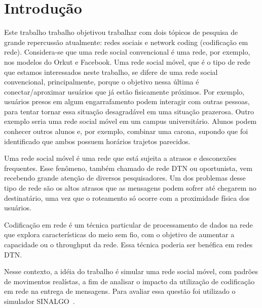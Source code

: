 \section{Introdução}

Este trabalho trabalho objetivou trabalhar com dois tópicos de pesquisa
de grande repercussão atualmente: redes sociais e network coding
(codificação em rede). Considera-se que uma rede social convencional é
uma rede, por exemplo, nos modelos do Orkut e Facebook.  Uma rede social
móvel, que é o tipo de rede que estamos interessados neste trabalho, se
difere de uma rede social convencional, principalmente, porque o
objetivo nessa última é conectar/aproximar usuários que já estão
fisicamente próximos. Por exemplo, usuários presos em algum
engarrafamento podem interagir com outras pessoas, para tentar tornar
essa situação desagradável em uma situação prazerosa. Outro exemplo
seria uma rede social móvel em um campus universitário. Alunos podem
conhecer outros alunos e, por exemplo, combinar uma carona, supondo que
foi identificado que ambos possuem horários trajetos parecidos.

Uma rede social móvel é uma rede que está sujeita a atrasos e
desconexões frequentes. Esse fenômeno, também chamado de rede DTN ou
oportunista, vem recebendo grande atenção de diversos pesquisadores. Um
dos problemas desse tipo de rede são os altos atrasos que as mensagens
podem sofrer até chegarem no destinatário, uma vez que o roteamento só
ocorre com a proximidade física dos usuários.

Codificação em rede é um técnica particular de processamento de dados na
rede que explora características do meio sem fio, com o objetivo de
aumentar a capacidade ou o throughput da rede. Essa técnica poderia ser
benéfica em redes DTN.

Nesse contexto, a idéia do trabalho é simular uma rede social móvel, com
padrões de movimentos realístas, a fim de analisar o impacto da
utilização de codificação em rede na entrega de mensagens. Para avaliar
essa questão foi utilizado o simulador SINALGO~\cite{sinalgo}. 

